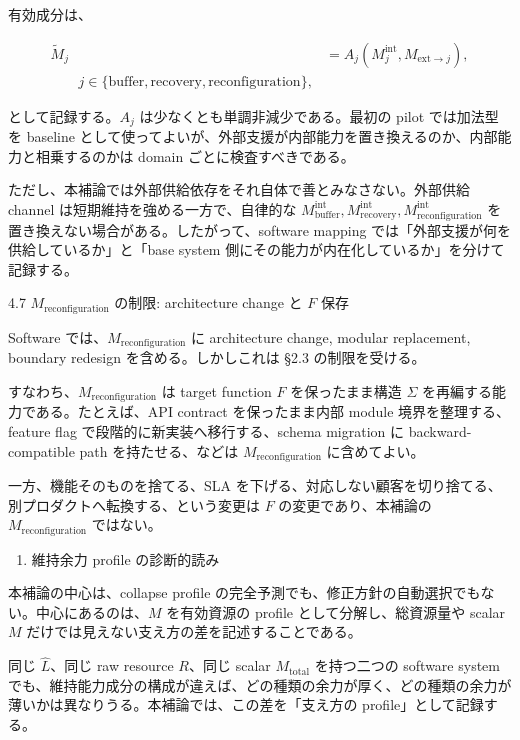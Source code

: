 \documentclass[12pt,a4paper]{article}
\begin{document}
有効成分は、

\[
\begin{aligned}
\widetilde M_{j} &= A_{j}(M_{j}^{\mathrm{int}}, M_{\mathrm{ext}\to j}), \\
\qquad j\in\{\mathrm{buffer},\mathrm{recovery},\mathrm{reconfiguration}\},
\end{aligned}
\]

として記録する。\(A_j\) は少なくとも単調非減少である。最初の pilot では加法型を baseline として使ってよいが、外部支援が内部能力を置き換えるのか、内部能力と相乗するのかは domain ごとに検査すべきである。

ただし、本補論では外部供給依存をそれ自体で善とみなさない。外部供給 channel は短期維持を強める一方で、自律的な \(M_{\mathrm{buffer}}^{\mathrm{int}}, M_{\mathrm{recovery}}^{\mathrm{int}}, M_{\mathrm{reconfiguration}}^{\mathrm{int}}\) を置き換えない場合がある。したがって、software mapping では「外部支援が何を供給しているか」と「base system 側にその能力が内在化しているか」を分けて記録する。

4.7 \(M_{\mathrm{reconfiguration}}\) の制限: architecture change と \(F\) 保存

Software では、\(M_{\mathrm{reconfiguration}}\) に architecture change, modular replacement, boundary redesign を含める。しかしこれは §2.3 の制限を受ける。

すなわち、\(M_{\mathrm{reconfiguration}}\) は target function \(F\) を保ったまま構造 \(\Sigma\) を再編する能力である。たとえば、API contract を保ったまま内部 module 境界を整理する、feature flag で段階的に新実装へ移行する、schema migration に backward-compatible path を持たせる、などは \(M_{\mathrm{reconfiguration}}\) に含めてよい。

一方、機能そのものを捨てる、SLA を下げる、対応しない顧客を切り捨てる、別プロダクトへ転換する、という変更は \(F\) の変更であり、本補論の \(M_{\mathrm{reconfiguration}}\) ではない。

\begin{enumerate}
\def\labelenumi{\arabic{enumi}.}
\setcounter{enumi}{4}
\tightlist
\item
  維持余力 profile の診断的読み
\end{enumerate}

本補論の中心は、collapse profile の完全予測でも、修正方針の自動選択でもない。中心にあるのは、\(M\) を有効資源の profile として分解し、総資源量や scalar \(M\) だけでは見えない支え方の差を記述することである。

同じ \(\hat L\)、同じ raw resource \(R\)、同じ scalar \(M_{\mathrm{total}}\) を持つ二つの software system でも、維持能力成分の構成が違えば、どの種類の余力が厚く、どの種類の余力が薄いかは異なりうる。本補論では、この差を「支え方の profile」として記録する。
\end{document}
